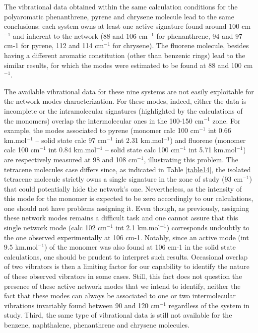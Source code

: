  	The vibrational data obtained within the same calculation conditions for the polyaromatic phenanthrene, pyrene and chrysene molecule lead to the same conclusions: each system owns at least one active signature found around 100 cm$^{-1}$ and inherent to the network (88 and 106 cm$^{-1}$ for phenanthrene, 94 and 97 cm-1 for pyrene, 112 and 114 cm$^{-1}$ for chrysene). The fluorene molecule, besides having a different aromatic constitution (other than benzenic rings) lead to the similar results, for which the modes were estimated to be found at 88 and 100 cm$^{-1}$.
 	
 	The available vibrational data for these nine systems are not easily exploitable for the network modes characterization. For these modes, indeed, either the data is incomplete or the intramolecular signatures (highlighted by the calculations of the monomers) overlap the intermolecular ones in the 100-150 cm$^{-1}$ zone.  For example, the modes associated to pyrene (monomer calc 100 cm$^{-1}$ int 0.66 km.mol$^{-1}$ – solid state calc 97 cm$^{-1}$ int 2.31 km.mol$^{-1}$) and fluorene (monomer calc 100 cm$^{-1}$ int 0.84 km.mol$^{-1}$ – solid state calc 100 cm$^{-1}$ int 5.71 km.mol$^{-1}$) are respectively measured at 98 and 108 cm$^{-1}$, illustrating this problem.
 	The tetracene molecules case differs since, as indicated in Table \ref{table14}, the isolated tetracene molecule strictly owns a single signature in the zone of study (93 cm$^{-1}$) that could potentially hide the network’s one. Nevertheless, as the intensity of this mode for the monomer is expected to be zero accordingly to our calculations, one should not have problems assigning it. Even though, as previously, assigning these network modes remains a difficult task and one cannot assure that this single network mode (calc 102 cm$^{-1}$ int 2.1 km.mol$^{-1}$) corresponds undoubtly to the one observed experimentally at 106 cm-1. Notably, since an active mode (int 9.5 km.mol$^{-1}$) of the monomer was also found at 106 cm-1 in the solid state calculations, one should be prudent to interpret such results. Occasional overlap of two vibrators is then a limiting factor for our capability to identify the nature of these observed vibrators in some cases. Still, this fact does not question the presence of these active network modes that we intend to identify, neither the fact that these modes can always be associated to one or two intermolecular vibrations invariably found between 90 and 120 cm$^{-1}$ regardless of the system in study. Third, the same type of vibrational data is still not available for the benzene, naphthalene, phenanthrene and chrysene molecules.\\ 
 	
